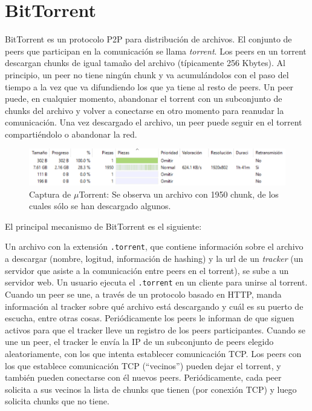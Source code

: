 \documentclass{article}
\begin{document}
\section{BitTorrent} 

BitTorrent es un protocolo P2P para distribución de archivos. El
conjunto de peers que participan en la comunicación se llama
\textit{torrent}. Los peers en un torrent descargan chunks de igual
tamaño del archivo (típicamente 256 Kbytes). Al principio, un
peer no tiene ningún chunk y va acumulándolos con el paso del tiempo a la vez que va difundiendo los que ya tiene al resto de peers. Un peer puede, en cualquier momento, abandonar el torrent con un subconjunto de chunks del archivo y volver a conectarse en otro momento para reanudar la comunicación. Una vez descargado el archivo, un peer puede seguir en el torrent compartiéndolo o abandonar la red.\\

\begin{figure}[H]
  \centering
  \includegraphics[width=139mm]{imagenes/piezasUtorrent}
  \caption{ Captura de $\mu$Torrent: Se observa un archivo con 1950 chunk, de los cuales sólo se han descargado algunos.}
\end{figure}

El principal mecanismo de BitTorrent es el siguiente:

Un archivo con la extensión \texttt{.torrent}, que contiene
información sobre el archivo a descargar (nombre, logitud, información
de hashing) y la url de un \textit{tracker} (un servidor que asiste a
la comunicación entre peers en el torrent), se sube a un servidor
web. Un usuario ejecuta el \texttt{.torrent} en un cliente para unirse
al torrent. Cuando un peer se une, a través de un protocolo basado en
HTTP, manda información al tracker sobre qué archivo está descargando
y cuál es su puerto de escucha, entre otras cosas. Periódicamente los
peers le informan de que siguen activos para que el tracker lleve un registro de los peers participantes. Cuando se une un peer, el tracker le envía la IP de un subconjunto de peers elegido aleatoriamente, con los que intenta establecer comunicación TCP. Los peers con los que establece comunicación TCP (``vecinos'') pueden dejar el torrent, y también pueden conectarse con él nuevos peers. Periódicamente, cada peer solicita a sus vecinos la lista de chunks que tienen (por conexión TCP) y luego solicita chunks que no tiene.\\
\end{document}
